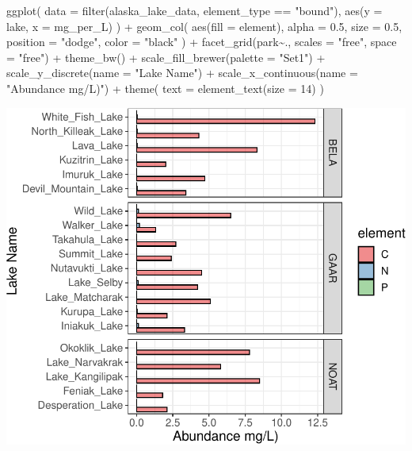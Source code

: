 \documentclass[
]{krantz}
\newenvironment{Shaded}{\begin{snugshade}}{\end{snugshade}}
\newcommand{\AttributeTok}[1]{\textcolor[rgb]{0.77,0.63,0.00}{#1}}
\newcommand{\DecValTok}[1]{\textcolor[rgb]{0.00,0.00,0.81}{#1}}
\newcommand{\FloatTok}[1]{\textcolor[rgb]{0.00,0.00,0.81}{#1}}
\newcommand{\FunctionTok}[1]{\textcolor[rgb]{0.00,0.00,0.00}{#1}}
\newcommand{\NormalTok}[1]{#1}
\newcommand{\SpecialCharTok}[1]{\textcolor[rgb]{0.00,0.00,0.00}{#1}}
\newcommand{\StringTok}[1]{\textcolor[rgb]{0.31,0.60,0.02}{#1}}
\begin{document}
\begin{Shaded}
\begin{Highlighting}[]
\FunctionTok{ggplot}\NormalTok{(}
  \AttributeTok{data =} \FunctionTok{filter}\NormalTok{(alaska\_lake\_data, element\_type }\SpecialCharTok{==} \StringTok{"bound"}\NormalTok{),}
  \FunctionTok{aes}\NormalTok{(}\AttributeTok{y =}\NormalTok{ lake, }\AttributeTok{x =}\NormalTok{ mg\_per\_L)}
\NormalTok{) }\SpecialCharTok{+}
  \FunctionTok{geom\_col}\NormalTok{(}
    \FunctionTok{aes}\NormalTok{(}\AttributeTok{fill =}\NormalTok{ element),}
    \AttributeTok{alpha =} \FloatTok{0.5}\NormalTok{, }\AttributeTok{size =} \FloatTok{0.5}\NormalTok{, }\AttributeTok{position =} \StringTok{"dodge"}\NormalTok{,}
    \AttributeTok{color =} \StringTok{"black"}
\NormalTok{  ) }\SpecialCharTok{+}
  \FunctionTok{facet\_grid}\NormalTok{(park}\SpecialCharTok{\textasciitilde{}}\NormalTok{., }\AttributeTok{scales =} \StringTok{"free"}\NormalTok{, }\AttributeTok{space =} \StringTok{"free"}\NormalTok{) }\SpecialCharTok{+}
  \FunctionTok{theme\_bw}\NormalTok{() }\SpecialCharTok{+}
  \FunctionTok{scale\_fill\_brewer}\NormalTok{(}\AttributeTok{palette =} \StringTok{"Set1"}\NormalTok{) }\SpecialCharTok{+}
  \FunctionTok{scale\_y\_discrete}\NormalTok{(}\AttributeTok{name =} \StringTok{"Lake Name"}\NormalTok{) }\SpecialCharTok{+}
  \FunctionTok{scale\_x\_continuous}\NormalTok{(}\AttributeTok{name =} \StringTok{"Abundance mg/L)"}\NormalTok{) }\SpecialCharTok{+}
  \FunctionTok{theme}\NormalTok{(}
    \AttributeTok{text =} \FunctionTok{element\_text}\NormalTok{(}\AttributeTok{size =} \DecValTok{14}\NormalTok{)}
\NormalTok{  )}
\end{Highlighting}
\end{Shaded}

\begin{center}\includegraphics[width=0.8\linewidth]{index_files/figure-latex/unnamed-chunk-177-1} \end{center}
\end{document}
